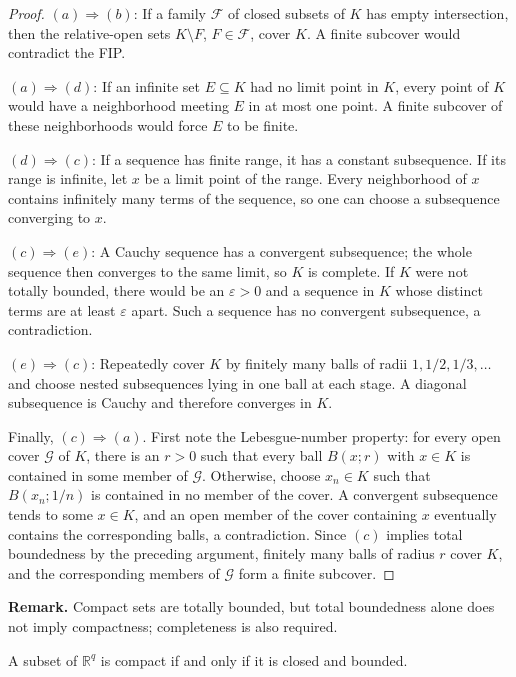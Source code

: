 \begin{proof}
$(a)\Rightarrow(b)$: If a family $\mathcal{F}$ of closed subsets of $K$ has
empty intersection, then the relative-open sets $K\setminus F$, $F\in
\mathcal{F}$, cover $K$. A finite subcover would contradict the FIP.

$(a)\Rightarrow(d)$: If an infinite set $E\subseteq K$ had no limit point in
$K$, every point of $K$ would have a neighborhood meeting $E$ in at most one
point. A finite subcover of these neighborhoods would force $E$ to be finite.

$(d)\Rightarrow(c)$: If a sequence has finite range, it has a constant
subsequence. If its range is infinite, let $x$ be a limit point of the range.
Every neighborhood of $x$ contains infinitely many terms of the sequence, so
one can choose a subsequence converging to $x$.

$(c)\Rightarrow(e)$: A Cauchy sequence has a convergent subsequence; the whole
sequence then converges to the same limit, so $K$ is complete. If $K$ were not
totally bounded, there would be an $\varepsilon>0$ and a sequence in $K$ whose
distinct terms are at least $\varepsilon$ apart. Such a sequence has no
convergent subsequence, a contradiction.

$(e)\Rightarrow(c)$: Repeatedly cover $K$ by finitely many balls of radii
$1,1/2,1/3,\ldots$ and choose nested subsequences lying in one ball at each
stage. A diagonal subsequence is Cauchy and therefore converges in $K$.

Finally, $(c)\Rightarrow(a)$. First note the Lebesgue-number property: for
every open cover $\mathcal{G}$ of $K$, there is an $r>0$ such that every ball
$B(x;r)$ with $x\in K$ is contained in some member of $\mathcal{G}$. Otherwise,
choose $x_n\in K$ such that $B(x_n;1/n)$ is contained in no member of the
cover. A convergent subsequence tends to some $x\in K$, and an open member of
the cover containing $x$ eventually contains the corresponding balls, a
contradiction. Since $(c)$ implies total boundedness by the preceding
argument, finitely many balls of radius $r$ cover $K$, and the corresponding
members of $\mathcal{G}$ form a finite subcover.
\end{proof}

\textbf{Remark.} Compact sets are totally bounded, but total boundedness alone
does not imply compactness; completeness is also required.

\begin{thm}
A subset of $\mathbb{R}^q$ is compact if and only if it is closed and bounded.
\end{thm}

